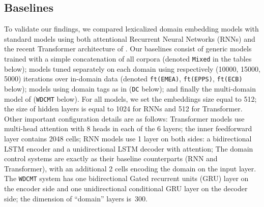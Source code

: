 \documentclass[11pt,a4paper]{article}
\newcommand{\fyDone}[1]{\done[FY]\Todo[FY:]{\textcolor{orange}{#1}}}
\begin{document}
\subsection{Baselines \label{ssec:baselines}}
To validate our findings, we compared lexicalized domain embedding models with standard models using both attentional Recurrent Neural Networks (RNNs) \cite{Bahdanau15learning} and the recent Transformer architecture of \citet{Vaswani17attention}. Our baselines consist of generic models trained with a simple concatenation of all corpora (denoted \texttt{Mixed} in the tables below); models tuned separately on each domain using respectively (10000, 15000, 5000) iterations over in-domain data (denoted \texttt{ft(EMEA)}, \texttt{ft(EPPS)}, \texttt{ft(ECB)} below); models using domain tags as in \cite{Kobus17domaincontrol} (\texttt{DC} below); and finally the multi-domain model of \citet{Zeng18multidomain} (\texttt{WDCMT} below).\fyDone{Change names in tables}
For all models, we set the embeddings size equal to 512; the size of hidden layers is equal to 1024 for RNNs and 512 for Transformer. Other important configuration details are as follows:
\fyDone{Improve this}
Transformer models use multi-head attention with 8 heads in each of the 6 layers; the inner feedforward layer contains 2048 cells; 
RNN models use 1 layer on both sides: a bidirectional LSTM encoder and a unidirectional LSTM decoder with attention;
The domain control systems are exactly as their baseline counterparts (RNN and Transformer), with an additional 2 cells encoding the domain on the input layer.\fyDone{Check This!}
The \texttt{WDCMT} system has one bidirectional Gated recurrent units (GRU) layer on the encoder side and one unidirectional conditional GRU layer on the decoder side; the dimension of ``domain'' layers is~300.
\end{document}

